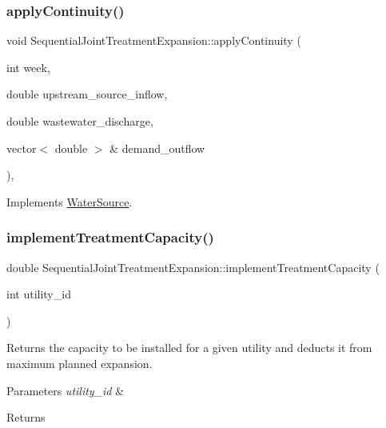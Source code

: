 \subsubsection{\texorpdfstring{apply\+Continuity()}{applyContinuity()}}
{\footnotesize\ttfamily void Sequential\+Joint\+Treatment\+Expansion\+::apply\+Continuity (\begin{DoxyParamCaption}\item[{int}]{week,  }\item[{double}]{upstream\+\_\+source\+\_\+inflow,  }\item[{double}]{wastewater\+\_\+discharge,  }\item[{vector$<$ double $>$ \&}]{demand\+\_\+outflow }\end{DoxyParamCaption})\hspace{0.3cm}{\ttfamily [override]}, {\ttfamily [virtual]}}



Implements \mbox{\hyperlink{classWaterSource_ac070445379fe706f65b977dade4f3fbc_ac070445379fe706f65b977dade4f3fbc}{Water\+Source}}.

\mbox{\label{classSequentialJointTreatmentExpansion_a06a2e9479bd639661cd8241e571c5711_a06a2e9479bd639661cd8241e571c5711}} 
\subsubsection{\texorpdfstring{implement\+Treatment\+Capacity()}{implementTreatmentCapacity()}}
{\footnotesize\ttfamily double Sequential\+Joint\+Treatment\+Expansion\+::implement\+Treatment\+Capacity (\begin{DoxyParamCaption}\item[{int}]{utility\+\_\+id }\end{DoxyParamCaption})}

Returns the capacity to be installed for a given utility and deducts it from maximum planned expansion. 
\begin{DoxyParams}{Parameters}
{\em utility\+\_\+id} & \\
\hline
\end{DoxyParams}
\begin{DoxyReturn}{Returns}

\end{DoxyReturn}
\mbox{\label{classSequentialJointTreatmentExpansion_a53413658de78fecdb2e0d451a20eb82c_a53413658de78fecdb2e0d451a20eb82c}} 
